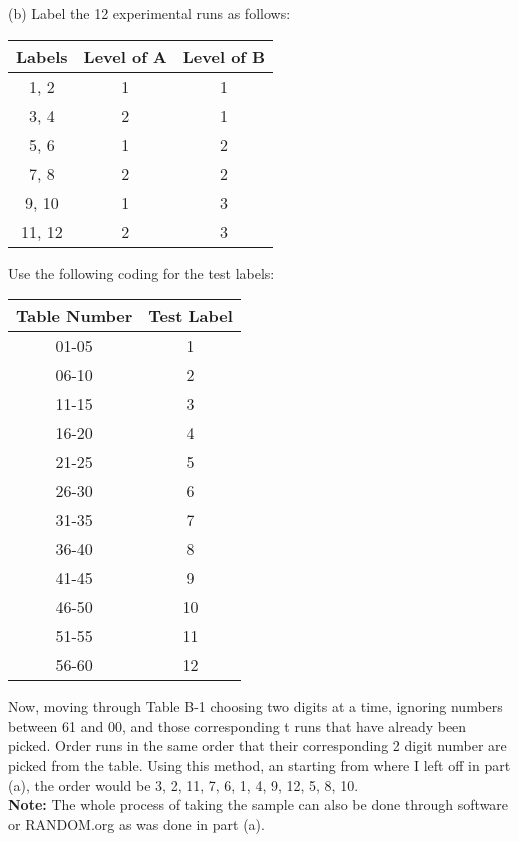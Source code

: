 \documentclass[11pt]{article}\usepackage[]{graphicx}\usepackage[]{color}
\begin{document}
\begin{itemize}
(b) Label the 12 experimental runs as follows:
\begin{center}
	\begin{tabular}{|c|c|c|}
		\hline
		Labels & Level of A &  Level of B\\
		\hline
		1, 2 & 1 & 1\\
		3, 4 & 2 & 1\\
		5, 6 & 1 & 2\\
		7, 8 & 2 & 2\\
		9, 10 & 1 & 3\\
		11, 12 & 2 &3\\
		\hline
	\end{tabular}
	
\end{center}
Use the following coding for the test labels:
\begin{center}
	\begin{tabular}{|c|c|}
		\hline
		Table Number & Test Label\\
		\hline
		01-05 & 1\\
		06-10 & 2\\
		11-15 & 3\\
		16-20 & 4\\
		21-25 & 5\\
		26-30 & 6\\
		31-35 & 7\\
		36-40 & 8\\
		41-45 & 9\\
		46-50 & 10\\
		51-55 & 11\\
		56-60 & 12\\
		\hline
	
	\end{tabular}
\end{center}
Now, moving through Table B-1 choosing two digits at a time, ignoring numbers between 61 and 00, and those corresponding t runs that have already been picked. Order runs in the same order that their corresponding 2 digit number are picked from the table. Using this method, an starting from where I left off in part (a), the order would be 3, 2, 11, 7, 6, 1, 4, 9, 12, 5, 8, 10.\\
\textbf{Note:} The whole process of taking the sample can also be done through software or RANDOM.org as was done in part (a).


\end{itemize}
\end{document}
